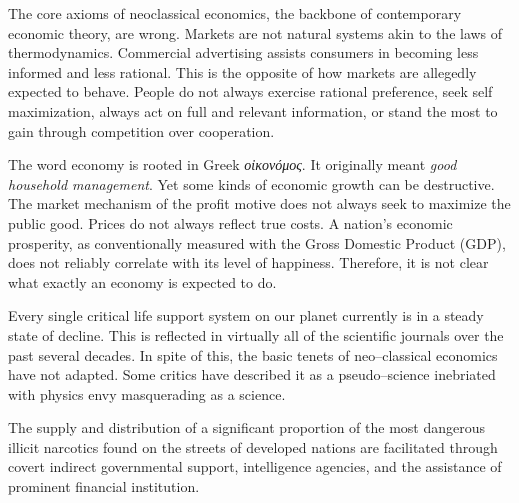 
The core axioms of neoclassical economics, the backbone of contemporary economic theory, are wrong. Markets are not natural systems akin to the laws of thermodynamics.
\footnotecite[lasn2012]
Commercial advertising assists consumers in becoming less informed and less rational. This is the opposite of how markets are allegedly expected to behave. People do not always exercise rational preference, seek self maximization, always act on full and relevant information, 
or stand the most to gain through competition over cooperation.

The word economy is rooted in Greek {\it οἰκονόμος}. It originally meant {\it good household management}. Yet some kinds of economic growth can be destructive.
\footnotecite[h2oil]
The market mechanism of the profit motive does not always seek to maximize the public good.
Prices do not always reflect true costs.
\footnotecite[roberts2013]
\footnotecite[cobb1999]
\footnotecite[oxfam2004]
\footnotecite[raj2010]
\footnotecite[extras={ See sections 4.6 and 4.11.}][agenda_21]
A nation's economic prosperity, as conventionally measured with the Gross Domestic Product (GDP), does not reliably correlate with its level of happiness.
 Therefore, it is not clear what exactly an economy is expected to do.

Every single critical life support system on our planet currently is in a steady state of decline. This is reflected in virtually all of the scientific journals over the past several decades. In spite of this, the basic tenets of neo--classical economics have not adapted. Some critics have described it as a pseudo--science inebriated with physics envy masquerading as a science.


The supply and distribution of a significant proportion of the most dangerous illicit narcotics found on the streets of developed nations are facilitated through covert indirect governmental support, intelligence agencies, and the assistance of prominent financial institution.
\footnotecite[webb1996]

